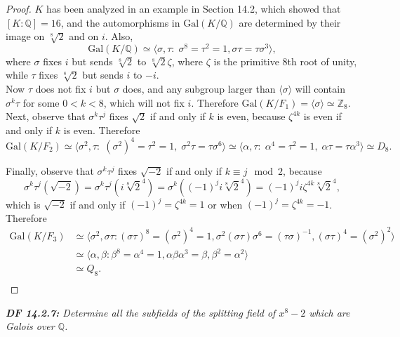 \documentclass{article}
\begin{document}
  \begin{proof}
    $K$ has been analyzed in an example in Section 14.2, which showed that
    $[K:\mathbb{Q}]=16$, and the automorphisms in
    $\text{Gal}(K/\mathbb{Q})$ are determined by their image on
    $\sqrt[8]{2}$ and on $i$. Also, 
    \[\text{Gal}(K/\mathbb{Q}) \simeq\langle \sigma,\tau:\;
    \sigma^8=\tau^2=1, \sigma\tau=\tau\sigma^3\rangle,\]
    where $\sigma$ fixes $i$ but sends $\sqrt[8]{2}$ to $\sqrt[8]{2}\zeta$,
    where $\zeta$ is the primitive 8th root of unity, while $\tau$ fixes
    $\sqrt[8]{2}$ but sends $i$ to $-i$. \\

    Now $\tau$ does not fix $i$ but $\sigma$ does, and any subgroup larger
    than $\langle\sigma\rangle$ will contain $\sigma^k\tau$ for some
    $0<k<8$, which will not fix $i$. Therefore $\text{Gal}(K/F_1)
    =\langle\sigma\rangle \simeq\mathbb{Z}_8$. \\

    Next, observe that $\sigma^k\tau^j$ fixes $\sqrt{2}$ if and only if $k$
    is even, because $\zeta^{4k}$ is even if and only if $k$ is even.
    Therefore
    \[\text{Gal}(K/F_2) \simeq\langle \sigma^2,\tau:\;
    (\sigma^2)^4=\tau^2=1,\; \sigma^2\tau=\tau\sigma^6 \rangle \simeq
    \langle \alpha,\tau:\; \alpha^4=\tau^2=1,\;
    \alpha\tau=\tau\alpha^3\rangle \simeq D_8.\]

    Finally, observe that $\sigma^k\tau^j$ fixes $\sqrt{-2}$ if and only if
    $k\equiv j\mod2$, because
    \[\sigma^k\tau^j(\sqrt{-2}) =\sigma^k\tau^j(i\sqrt[8]{2}^4)
    =\sigma^k((-1)^ji\sqrt[8]{2}^4) =(-1)^ji\zeta^{4k}\sqrt[8]{2}^4,\]
    which is $\sqrt{-2}$ if and only if $(-1)^j=\zeta^{4k}=1$ or when
    $(-1)^j=\zeta^{4k}=-1$. Therefore
    \begin{align*}
      \text{Gal}(K/F_3) &\simeq \langle \sigma^2,\sigma\tau:
        (\sigma\tau)^8=(\sigma^2)^4=1,
        \sigma^2(\sigma\tau)\sigma^6=(\tau\sigma)^{-1},
        (\sigma\tau)^4=(\sigma^2)^2\rangle \\
      &\simeq \langle \alpha,\beta: \beta^8=\alpha^4=1,
        \alpha\beta\alpha^3=\beta, \beta^2=\alpha^2\rangle \\
      &\simeq Q_8.\\
    \end{align*}
  \end{proof}

\it \textbf{DF 14.2.7:} Determine all the subfields of the splitting field
  of $x^8-2$ which are Galois over $\mathbb{Q}$.
\end{document}
